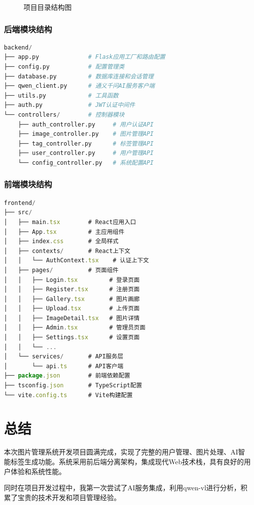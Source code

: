 \documentclass[cs4size,a4paper]{ctexart}
\numberwithin{equation}{section}
\numberwithin{table}{section}
\numberwithin{figure}{section}
\begin{document}
\begin{figure}[H]
    \caption{项目目录结构图}
\end{figure}

\subsubsection{后端模块结构}

\begin{lstlisting}[language=Python,caption=后端主要模块说明]
backend/
├── app.py              # Flask应用工厂和路由配置
├── config.py           # 配置管理类
├── database.py         # 数据库连接和会话管理
├── qwen_client.py      # 通义千问AI服务客户端
├── utils.py            # 工具函数
├── auth.py             # JWT认证中间件
└── controllers/        # 控制器模块
    ├── auth_controller.py     # 用户认证API
    ├── image_controller.py    # 图片管理API
    ├── tag_controller.py      # 标签管理API
    ├── user_controller.py     # 用户管理API
    └── config_controller.py   # 系统配置API
\end{lstlisting}

\subsubsection{前端模块结构}

\begin{lstlisting}[language=JavaScript,caption=前端主要模块说明]
frontend/
├── src/
│   ├── main.tsx        # React应用入口
│   ├── App.tsx         # 主应用组件
│   ├── index.css       # 全局样式
│   ├── contexts/       # React上下文
│   │   └── AuthContext.tsx    # 认证上下文
│   ├── pages/          # 页面组件
│   │   ├── Login.tsx         # 登录页面
│   │   ├── Register.tsx      # 注册页面
│   │   ├── Gallery.tsx       # 图片画廊
│   │   ├── Upload.tsx        # 上传页面
│   │   ├── ImageDetail.tsx   # 图片详情
│   │   ├── Admin.tsx         # 管理员页面
│   │   ├── Settings.tsx      # 设置页面
│   │   └── ...
│   └── services/       # API服务层
│       └── api.ts      # API客户端
├── package.json        # 前端依赖配置
├── tsconfig.json       # TypeScript配置
└── vite.config.ts      # Vite构建配置
\end{lstlisting}


\newpage

\section{总结}

本次图片管理系统开发项目圆满完成，实现了完整的用户管理、图片处理、AI智能标签生成功能。系统采用前后端分离架构，集成现代Web技术栈，具有良好的用户体验和系统性能。

同时在项目开发过程中，我第一次尝试了AI服务集成，利用qwen-vl进行分析，积累了宝贵的技术开发和项目管理经验。
\end{document}
